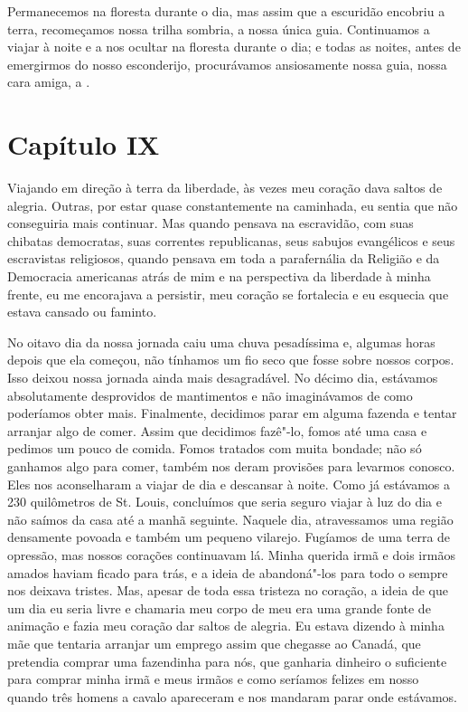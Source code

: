 Permanecemos na floresta durante o dia, mas assim que a escuridão
encobriu a terra, recomeçamos nossa trilha sombria, a 
nossa única guia. Continuamos a viajar à noite e a nos ocultar na
floresta durante o dia; e todas as noites, antes de emergirmos do nosso
esconderijo, procurávamos ansiosamente nossa guia, nossa cara amiga, a
.

\chapter{Capítulo IX}

Viajando em direção à terra da liberdade, às vezes meu coração dava
saltos de alegria. Outras, por estar quase constantemente na caminhada,
eu sentia que não conseguiria mais continuar. Mas quando pensava na
escravidão, com suas chibatas democratas, suas correntes republicanas,
seus sabujos evangélicos e seus escravistas religiosos, quando pensava
em toda a parafernália da Religião e da Democracia americanas atrás de
mim e na perspectiva da liberdade à minha frente, eu me encorajava a
persistir, meu coração se fortalecia e eu esquecia que estava cansado ou
faminto.

No oitavo dia da nossa jornada caiu uma chuva pesadíssima e, algumas
horas depois que ela começou, não tínhamos um fio seco que fosse sobre
nossos corpos. Isso deixou nossa jornada ainda mais desagradável. No
décimo dia, estávamos absolutamente desprovidos de mantimentos e não
imaginávamos de como poderíamos obter mais. Finalmente, decidimos parar
em alguma fazenda e tentar arranjar algo de comer. Assim que decidimos
fazê"-lo, fomos até uma casa e pedimos um pouco de comida. Fomos tratados
com muita bondade; não só ganhamos algo para comer, também nos deram
provisões para levarmos conosco. Eles nos aconselharam a viajar de dia e
descansar à noite. Como já estávamos a 230 quilômetros de St. Louis,
concluímos que seria seguro viajar à luz do dia e não saímos da casa até
a manhã seguinte. Naquele dia, atravessamos uma região densamente
povoada e também um pequeno vilarejo. Fugíamos de uma terra de opressão,
mas nossos corações continuavam lá. Minha querida irmã e dois irmãos
amados haviam ficado para trás, e a ideia de abandoná"-los para todo o
sempre nos deixava tristes. Mas, apesar de toda essa tristeza no
coração, a ideia de que um dia eu seria livre e chamaria meu corpo de
meu era uma grande fonte de animação e fazia meu coração dar saltos de
alegria. Eu estava dizendo à minha mãe que tentaria arranjar um emprego
assim que chegasse ao Canadá, que pretendia comprar uma fazendinha para
nós, que ganharia dinheiro o suficiente para comprar minha irmã e meus
irmãos e como seríamos felizes em nosso  quando três homens a
cavalo apareceram e nos mandaram parar onde estávamos.

